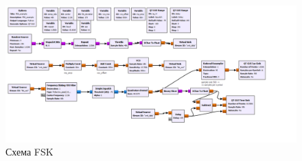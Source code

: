     \begin{landscape}
	\begin{figure}[H]
		\centering
		\includegraphics[width=25.5cm]{fig/lab12/fsk_scheme.png}
		\caption{Схема FSK}
		\label{pic:fsk_scheme} %
	\end{figure}
\end{landscape}

